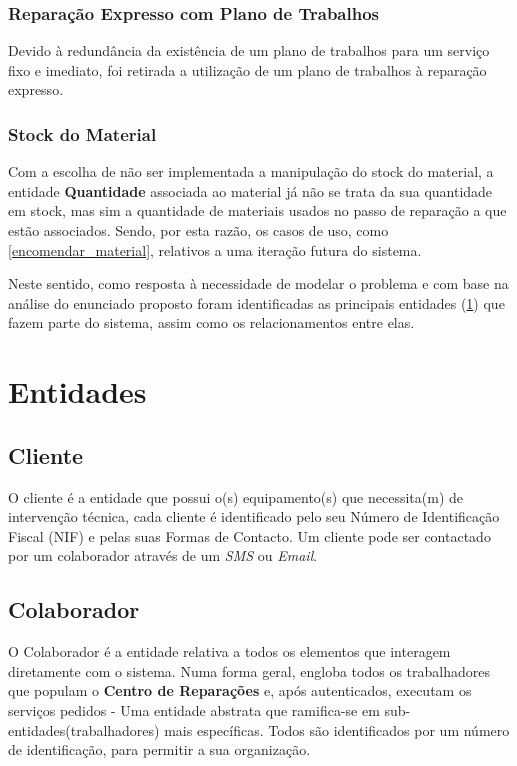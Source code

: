 \documentclass[a4paper,12pt]{scrreprt}
\begin{document}
\subsubsection{Reparação Expresso com Plano de Trabalhos}

Devido à redundância da existência de um plano de trabalhos para um serviço fixo e imediato, foi retirada 
a utilização de um plano de trabalhos à reparação expresso. 
    
\subsubsection{Stock do Material}

Com a escolha de não ser implementada a manipulação do stock do material, a entidade \textbf{Quantidade} associada ao material 
já não se trata da sua quantidade em stock, mas sim a quantidade de materiais usados no passo de reparação a que estão associados.
Sendo, por esta razão, os casos de uso, como  \ref{encomendar_material}, relativos a uma iteração futura do sistema.
    


Neste sentido, como resposta à necessidade de modelar o problema e com base na análise do enunciado proposto foram identificadas as 
principais entidades (\ref{ent}) que fazem parte do sistema, assim como os relacionamentos entre elas. 

\section{Entidades}\label{ent}

\subsection{Cliente}\label{ent_cliente}
O cliente é a entidade que possui o(s) equipamento(s) que necessita(m) de intervenção técnica, cada cliente é identificado pelo 
seu Número de Identificação Fiscal (NIF) e pelas suas Formas de Contacto. Um cliente pode ser contactado por um colaborador através
de um \textit{SMS} ou \textit{Email}.

\subsection{Colaborador} \label{ent_colaborador}
O Colaborador é a entidade relativa a todos os elementos que interagem diretamente com o sistema. 
Numa forma geral, engloba todos os trabalhadores que populam o \textbf{Centro de Reparações} e, após autenticados, executam os
serviços pedidos - Uma entidade abstrata que ramifica-se em sub-entidades(trabalhadores) mais específicas.
Todos são identificados por um número de identificação, para permitir a sua organização.
\end{document}
